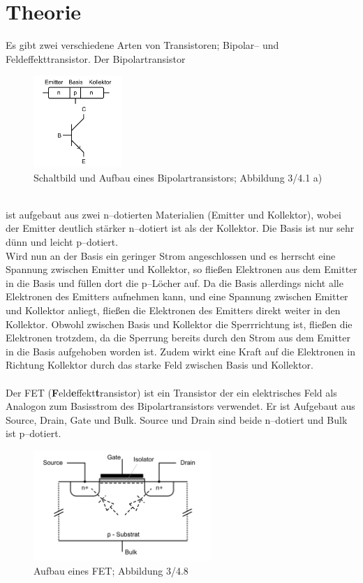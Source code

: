 \documentclass[a4paper,12pt]{article}
\numberwithin{equation}{section}
\begin{document}
\section{Theorie}
Es gibt zwei verschiedene Arten von Transistoren; Bipolar-- und Feldeffekttransistor.
Der Bipolartransistor
\begin{figure}[h]
        \centering
        \includegraphics[width=0.3\textwidth]{bipolartransistor.png}
        \caption{Schaltbild und Aufbau eines Bipolartransistors; Abbildung 3/4.1 a) \cite{Praktikumsanleitung}}
\end{figure}\\
ist aufgebaut aus zwei n--dotierten Materialien (Emitter und Kollektor), wobei der Emitter deutlich stärker n--dotiert ist als der Kollektor.
Die Basis ist nur sehr dünn und leicht p--dotiert.
\\\indent Wird nun an der Basis ein geringer Strom angeschlossen und es herrscht eine Spannung zwischen Emitter und Kollektor, so fließen Elektronen aus dem Emitter in die Basis und füllen dort die p--Löcher auf.
Da die Basis allerdings nicht alle Elektronen des Emitters aufnehmen kann, und eine Spannung zwischen Emitter und Kollektor anliegt, fließen die Elektronen des Emitters direkt weiter in den Kollektor.
Obwohl zwischen Basis und Kollektor die Sperrrichtung ist, fließen die Elektronen trotzdem, da die Sperrung bereits durch den Strom aus dem Emitter in die Basis aufgehoben worden ist.
Zudem wirkt eine Kraft auf die Elektronen in Richtung Kollektor durch das starke Feld zwischen Basis und Kollektor.
\\\\ Der FET (\textbf{F}eld\textbf{e}ffekt\textbf{t}ransistor) ist ein Transistor der ein elektrisches Feld als Analogon zum Basisstrom des Bipolartransistors verwendet.
Er ist Aufgebaut aus Source, Drain, Gate und Bulk.
Source und Drain sind beide n--dotiert und Bulk ist p--dotiert.
\begin{figure}[h]
        \centering
        \includegraphics[width=0.6\textwidth]{fet.png}
        \caption{Aufbau eines FET; Abbildung 3/4.8 \cite{Praktikumsanleitung}}
\end{figure}\\
\end{document}

